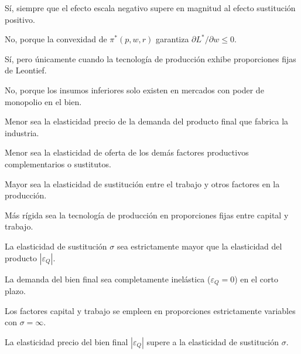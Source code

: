 \begin{opts}
    \item Sí, siempre que el efecto escala negativo supere en magnitud al efecto sustitución positivo.
    \item No, porque la convexidad de $\pi^*(p,w,r)$ garantiza $\partial L^*/\partial w \le 0$.
    \item Sí, pero únicamente cuando la tecnología de producción exhibe proporciones fijas de Leontief.
    \item No, porque los insumos inferiores solo existen en mercados con poder de monopolio en el bien.
\end{opts}

\begin{opts}
    \item Menor sea la elasticidad precio de la demanda del producto final que fabrica la industria.
    \item Menor sea la elasticidad de oferta de los demás factores productivos complementarios o sustitutos.
    \item Mayor sea la elasticidad de sustitución entre el trabajo y otros factores en la producción.
    \item Más rígida sea la tecnología de producción en proporciones fijas entre capital y trabajo.
\end{opts}

\begin{opts}
    \item La elasticidad de sustitución $\sigma$ sea estrictamente mayor que la elasticidad del producto $|\varepsilon_Q|$.
    \item La demanda del bien final sea completamente inelástica ($\varepsilon_Q = 0$) en el corto plazo.
    \item Los factores capital y trabajo se empleen en proporciones estrictamente variables con $\sigma = \infty$.
    \item La elasticidad precio del bien final $|\varepsilon_Q|$ supere a la elasticidad de sustitución $\sigma$.
\end{opts}

